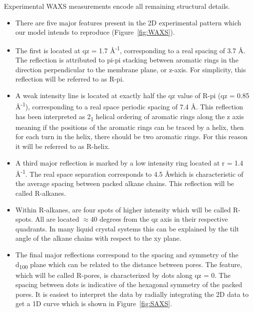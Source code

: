 \documentclass{article}
\newcommand{\angstrom}{\textup{\AA}}
\begin{document}
  Experimental WAXS measurements encode all remaining structural details. 
  \begin{itemize}
  	\item There are five major features present in the 2D experimental 
	pattern which our model intends to reproduce (Figure~\ref{fig:WAXS}).
	\item The first is located at qz = 1.7 \angstrom \textsuperscript{-1},
	corresponding to a real spacing of 3.7 \angstrom. The reflection is 
	attributed to pi-pi stacking between aromatic rings in the direction
	perpendicular to the membrane plane, or z-axis. For simplicity, this 
	reflection will be referred to as R-pi.
	\item A weak intensity line is located at exactly half the qz value of
	R-pi (qz = 0.85 \angstrom \textsuperscript{-1}), corresponding to a 
	real space periodic spacing of 7.4 \angstrom. This reflection has been 
	interpreted  as 2\textsubscript{1} helical ordering of aromatic rings 
	along the z axis meaning if the positions of the aromatic rings can
	be traced by a helix, then for each turn in the helix, there should be
	two aromatic rings. For this reason it will be referred to as R-helix.
	\item A third major reflection is marked by a low intensity ring located
	at r = 1.4 \angstrom \textsuperscript{-1}. The real space separation 
	corresponds to 4.5 \angstrom which is characteristic of the average 
	spacing between packed alkane chains. This reflection will be called R-alkanes.
	\item Within R-alkanes, are four spots of higher intensity which 
	will be called R-spots. All are located $\approx 40$ degrees from the qz axis
	in their respective quadrants. In many liquid crystal systems this can be
	explained by the tilt angle of the alkane chains with respect to the xy plane. %
	\item The final major reflections correspond to the spacing and symmetry of 
	the d\textsubscript{100} plane which can be related to the distance between
	pores. The feature, which will be called R-pores, is characterized by dots 
	along qz = 0. The spacing between dots is indicative of the hexagonal 
	symmetry of the packed pores. It is easiest to interpret the data by 
	radially integrating the 2D data to get a 1D curve which is shown in Figure~\ref{fig:SAXS}.
  \end{itemize}
\end{document}
